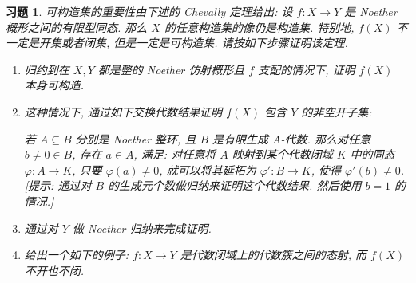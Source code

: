 \documentclass{article}
\theoremstyle{exercise}
\newtheorem{exercise}{习题}[section]
\begin{document}
\begin{exercise}
  可构造集的重要性由下述的 Chevally 定理给出:
  设 $f \colon X \to Y$ 是 Noether 概形之间的有限型同态.
  那么 $X$ 的任意构造集的像仍是构造集.
  特别地, $f(X)$ 不一定是开集或者闭集, 但是一定是可构造集.
  请按如下步骤证明该定理.
  \begin{enumerate}[label={(\alph*)}]
    \item 归约到在 $X, Y$ 都是整的 Noether 仿射概形且 $f$ 支配的情况下,
          证明 $f(X)$ 本身可构造.
    \item 这种情况下, 通过如下交换代数结果证明 $f(X)$ 包含 $Y$ 的非空开子集:

          若 $A \subseteq B$ 分别是 Noether 整环, 且 $B$ 是有限生成 $A$-代数.
          那么对任意 $b \neq 0 \in B$, 存在 $a \in A$, 满足:
          对任意将 $A$ 映射到某个代数闭域 $K$ 中的同态 $\varphi \colon A \to K$,
          只要 $\varphi(a) \neq 0$, 就可以将其延拓为 $\varphi' \colon B \to K$,
          使得 $\varphi'(b) \neq 0$.
          [\emph{提示: 通过对 $B$ 的生成元个数做归纳来证明这个代数结果.
          然后使用 $b = 1$ 的情况.}]
    \item 通过对 $Y$ 做 Noether 归纳来完成证明.
    \item 给出一个如下的例子: $f \colon X \to Y$ 是代数闭域上的代数簇之间的态射,
          而 $f(X)$ 不开也不闭.
  \end{enumerate}
\end{exercise}
\end{document}
